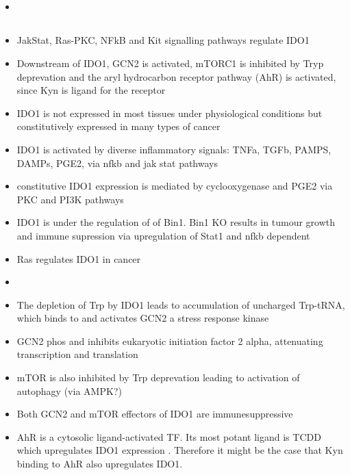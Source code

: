\documentclass{article}
\begin{document}
    \subsection{\cite{campbell2001phosphatidylinositol}}
    \begin{itemize}
        \item
    \end{itemize}

    \subsection{\cite{liu2018targeting}}
    \begin{itemize}
        \item JakStat, Ras-PKC, NFkB and Kit signalling pathways regulate IDO1
        \item Downstream of IDO1, GCN2 is activated, mTORC1 is inhibited by Tryp deprevation and the aryl hydrocarbon receptor pathway (AhR) is activated, since Kyn is ligand for the receptor
        \item IDO1 is not expressed in most tissues under physiological conditions but constitutively expressed in many types of cancer
        \item IDO1 is activated by diverse inflammatory signals: TNFa, TGFb, PAMPS, DAMPs, PGE2, via nfkb and jak stat pathways
        \item constitutive IDO1 expression is mediated by cyclooxygenase and PGE2 via PKC and PI3K pathways \cite{hennequart2017constitutive}
        \item IDO1 is under the regulation of of Bin1. Bin1 KO results in tumour growth and immune supression via upregulation of Stat1 and nfkb dependent \cite{muller2005inhibition}
        \item Ras regulates IDO1 in cancer
        \item
        \item The depletion of Trp by IDO1 leads to accumulation of uncharged Trp-tRNA, which binds to and activates GCN2 a stress response kinase
        \item GCN2 phos and inhibits eukaryotic initiation factor 2 alpha, attenuating transcription and translation
        \item mTOR is also inhibited by Trp deprevation leading to activation of autophagy (via AMPK?)
        \item Both GCN2 and mTOR effectors of IDO1 are immunesuppressive
        \item AhR is a cytosolic ligand-activated TF. Its most potant ligand is TCDD which upregulates IDO1 expression \cite{vogel2008aryl}. Therefore it might be the case that Kyn binding to AhR also upregulates IDO1.

\end{itemize}
\end{document}
